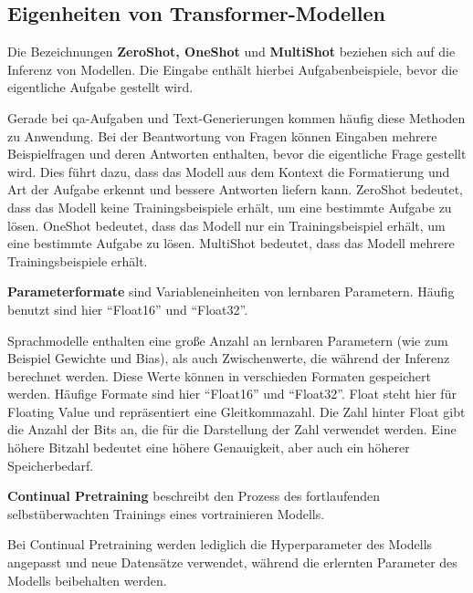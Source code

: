 \subsection{Eigenheiten von Transformer-Modellen}
\begin{definition}\label{def:zeroshot-oneshot-multishot}
    Die Bezeichnungen \textbf{ZeroShot, OneShot} und \textbf{MultiShot} beziehen sich auf die Inferenz von Modellen.
    Die Eingabe enthält hierbei Aufgabenbeispiele, bevor die eigentliche Aufgabe gestellt wird.
\end{definition}
Gerade bei \ac{qa}-Aufgaben und Text-Generierungen kommen häufig diese Methoden zu Anwendung.
Bei der Beantwortung von Fragen können Eingaben mehrere Beispielfragen und deren Antworten enthalten, bevor die eigentliche Frage gestellt wird.
Dies führt dazu, dass das Modell aus dem Kontext die Formatierung und Art der Aufgabe erkennt und bessere Antworten liefern kann.
\mbox{ZeroShot} bedeutet, dass das Modell keine Trainingsbeispiele erhält, um eine bestimmte Aufgabe zu lösen.
OneShot bedeutet, dass das Modell nur ein Trainingsbeispiel erhält, um eine bestimmte Aufgabe zu lösen.
MultiShot bedeutet, dass das Modell mehrere Trainingsbeispiele erhält.


\begin{definition}\label{def:parameterformate}
    \textbf{Parameterformate} sind Variableneinheiten von lernbaren Parametern.
    Häufig benutzt sind hier \enquote{Float16} und \enquote{Float32}.
\end{definition}
Sprachmodelle enthalten eine große Anzahl an lernbaren Parametern (wie zum Beispiel Gewichte und Bias),
als auch Zwischenwerte, die während der Inferenz berechnet werden.
Diese Werte können in verschieden Formaten gespeichert werden.
Häufige Formate sind hier \enquote{Float16} und \enquote{Float32}.
Float steht hier für Floating Value und repräsentiert eine Gleitkommazahl.
Die Zahl hinter Float gibt die Anzahl der Bits an, die für die Darstellung der Zahl verwendet werden.
Eine höhere Bitzahl bedeutet eine höhere Genauigkeit, aber auch ein höherer Speicherbedarf.

\begin{definition}\label{def:continual-pretraining}
    \textbf{Continual Pretraining} beschreibt den Prozess des fortlaufenden selbstüberwachten Trainings eines vortrainieren Modells.
\end{definition}
Bei Continual Pretraining werden lediglich die Hyperparameter des Modells angepasst und neue Datensätze verwendet, während die erlernten Parameter des Modells beibehalten werden.


